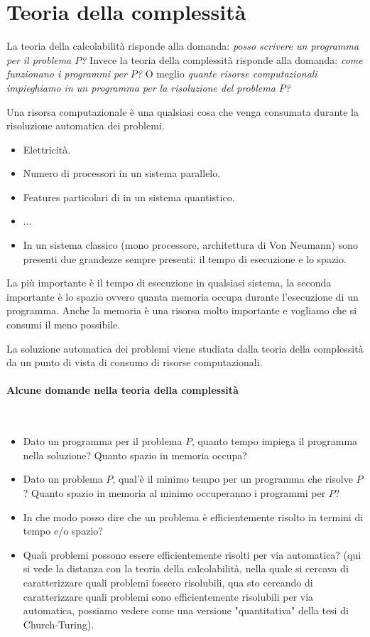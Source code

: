 \documentclass{article}
\begin{document}
\section{Teoria della complessità}
La teoria della calcolabilità risponde alla domanda: \textit{posso
scrivere un programma per il problema $P$?}
Invece la teoria della complessità risponde alla domanda: \textit{come
funzionano i programmi per $P$?}
O meglio \textit{quante risorse computazionali impieghiamo
in un programma per la risoluzione
del problema $P$?}

Una risorsa computazionale è una qualsiasi cosa che venga consumata
durante la risoluzione automatica dei problemi.
\begin{itemize}
    \item Elettricità.
    \item Numero di processori in un sistema parallelo.
    \item Features particolari di in un sistema quantistico.
    \item $\dots$
    \item In un sistema classico (mono processore, architettura di Von Neumann) sono presenti due
    grandezze sempre presenti: il tempo di esecuzione e lo spazio.
\end{itemize}
La più importante è il tempo di esecuzione in qualsiasi sistema, la seconda
importante è lo spazio ovvero quanta memoria occupa durante l'esecuzione di un programma.
Anche la memoria è una risorsa molto importante e vogliamo che si consumi il meno possibile.

La soluzione automatica dei problemi viene studiata dalla teoria della complessità
da un punto di vista di consumo di risorse computazionali.

\paragraph{Alcune domande nella teoria della complessità}\mbox{}\\
\begin{itemize}
    \item Dato un programma per il problema $P$, quanto tempo impiega
    il programma nella soluzione? Quanto spazio in memoria occupa?

    \item Dato un problema $P$, qual'è il minimo tempo per
    un programma che risolve $P$? Quanto spazio in memoria
    al minimo occuperanno i programmi per $P$?

    \item In che modo posso dire che un problema è efficientemente
    risolto in termini di tempo e/o spazio?

    \item Quali problemi possono essere efficientemente risolti per
    via automatica? (qui si vede la distanza con la teoria della
    calcolabilità, nella quale si cercava di caratterizzare
    quali problemi fossero risolubili, qua sto cercando di caratterizzare
    quali problemi sono efficientemente risolubili per via automatica,
    possiamo vedere come una versione "quantitativa" della tesi di
    Church-Turing).
\end{itemize}
\end{document}

